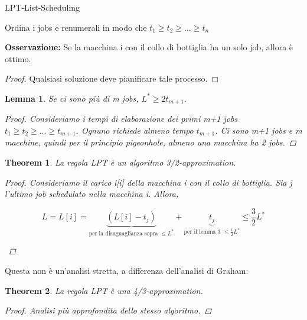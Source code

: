 \documentclass{article}
\newtheorem{theorem}{Theorem}[subsection]
\newtheorem{lemma}{Lemma}[subsection]
\begin{document}
\begin{center}
\begin{algorithm}
\caption{LPT-List-Scheduling}
Ordina i jobs e renumerali in modo che $t_1\geq t_2 \geq\dots\geq t_n\;$
\end{algorithm}
\end{center}
\noindent\textbf{Osservazione:} Se la macchina i con il collo di bottiglia ha un solo job, allora è ottimo.
\begin{proof}
    Qualsiasi soluzione deve pianificare tale processo.
\end{proof}
\begin{lemma}
    Se ci sono più di m jobs, $L^*\geq 2t_{m+1}$.
    \begin{proof}
        Consideriamo i tempi di elaborazione dei primi m+1 jobs $t_1\geq t_2\geq\dots\geq t_{m+1}$. Ognuno richiede almeno tempo $t_{m+1}$. Ci sono m+1 jobs e m macchine, quindi per il principio pigeonhole, almeno una macchina ha 2 jobs.
    \end{proof}
\end{lemma}
\begin{theorem}
    La regola LPT è un algoritmo 3/2-approximation.
    \begin{proof}
        Consideriamo il carico l[i] della macchina i con il collo di bottiglia. Sia j l'ultimo job schedulato nella macchina i. Allora,
        \begin{center}
            $$
             L = L[i] = \underbrace{(L[i]-t_j)}_\text{per la disuguaglianza sopra $\leq L^*$}+\underbrace{t_j}_\text{per il lemma 3 $\leq \frac{1}{2}L^*$} \leq \frac{3}{2}L^*
            $$
        \end{center}
    \end{proof}
\end{theorem}
Questa non è un'analisi stretta, a differenza dell'analisi di Graham:
\begin{theorem}
    La regola LPT è una 4/3-approximation.
    \begin{proof}
        Analisi più approfondita dello stesso algoritmo.
    \end{proof}
\end{theorem}
\newpage
\end{document}
